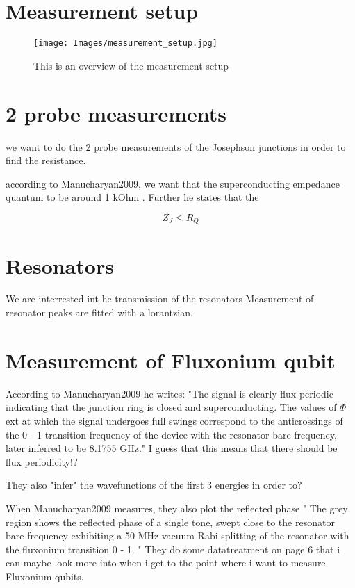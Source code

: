 \chapter{Measurement setup}

\begin{figure}
    \centering
    \texttt{[image: Images/measurement\_setup.jpg]}
    \caption{This is an overview of the measurement setup}
    \label{fig:measurement_setup}
\end{figure}

\chapter{2 probe measurements}
we want to do the 2 probe measurements of the Josephson junctions in order to find the resistance. 

according to Manucharyan2009, we want that the superconducting empedance quantum to be around 1 kOhm \Cite{Manucharyan2009}. Further he states that the 

\begin{equation}
Z_{J} \leq R_{Q}    
\end{equation}


\chapter{Resonators}
We are interrested int he transmission of the resonators
Measurement of resonator peaks are fitted with a lorantzian. \Cite{Manucharyan2009}



\chapter{Measurement of Fluxonium qubit}

According to Manucharyan2009 \Cite{Manucharyan2009} he writes: "The signal is clearly flux-periodic indicating that the junction ring is closed and superconducting. The values of $\Phi$ext at which the signal undergoes full swings correspond to the anticrossings of the 0 - 1 transition frequency of the device with the resonator bare frequency, later inferred to be 8.1755 GHz." I guess that this means that there should be flux periodicity!?

They also "infer" the wavefunctions of the first 3 energies in order to? \Cite{Manucharyan2009}


When Manucharyan2009 measures, they also plot the reflected phase " The grey region shows the reflected phase of a single tone, swept close to the resonator bare frequency exhibiting a 50 MHz vacuum Rabi splitting of the resonator with the fluxonium transition 0  - 1. " They do some datatreatment on page 6 that i can maybe look more into when i get to the point where i want to measure Fluxonium qubits. 
